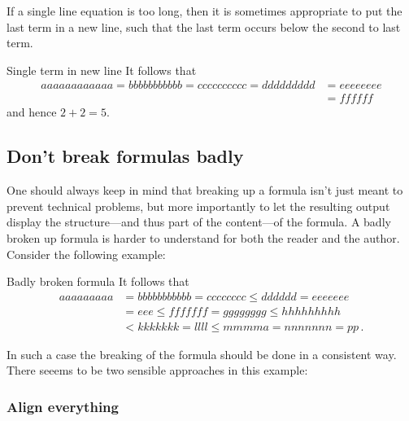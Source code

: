If a single line equation is too long, then it is sometimes appropriate to put the last term in a new line, such that the last term occurs below the second to last term.
\begin{showlatex}{Single term in new line}
It follows that
\begin{align*}
  aaaaaaaaaaaa
  =
  bbbbbbbbbbb
  =
  cccccccccc
  =
  ddddddddd
  &=
  eeeeeeee
  \\
  &=
  ffffff
\end{align*}
and hence $2 + 2 = 5$.
\end{showlatex}



\subsection{Don’t break formulas badly}

One should always keep in mind that breaking up a formula isn’t just meant to prevent technical problems, but more importantly to let the resulting output display the structure---and thus part of the content---of the formula.
A badly broken up formula is harder to understand for both the reader and the author.
Consider the following example:
\begin{showlatex}{Badly broken formula}
It follows that
\begin{align*}
  aaaaaaaaa
  &=
  bbbbbbbbbbb
  =
  cccccccc
  \leq
  dddddd
  =
  eeeeeee
  \\
  &=
  eee
  \leq
  fffffff
  =
  gggggggg
  \leq
  hhhhhhhhh
  \\
  &<
  kkkkkkk
  =
  llll
  \leq
  mmmma
  =
  nnnnnnn
  =
  pp \,.
\end{align*}
\end{showlatex}
In such a case the breaking of the formula should be done in a consistent way.
There seeems to be two sensible approaches in this example:

\subsubsection{Align everything}

